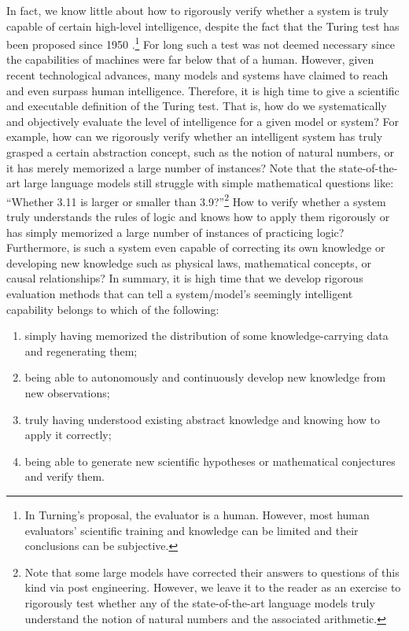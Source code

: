 \documentclass[../../book-main.tex]{subfiles}
\begin{document}
In fact, we know little about how to rigorously verify whether a system is truly capable of certain high-level intelligence, despite the fact that the Turing test has been proposed since 1950 \cite{Turing-1950}.\footnote{In Turning's proposal, the evaluator is a human. However, most human evaluators' scientific training and knowledge can be limited and their conclusions can be subjective.} For long such a test was not deemed necessary since the capabilities of machines were far below that of a human. However, given recent technological advances, many models and systems have claimed to reach and even surpass human intelligence. Therefore, it is high time to give a scientific and executable definition of the Turing test. That is, how do we systematically and objectively evaluate the level of intelligence for a given model or system? For example, how can we rigorously verify whether an intelligent system has truly grasped a certain abstraction concept, such as the notion of natural numbers, or it has merely memorized a large number of instances? Note that the state-of-the-art large language models still struggle with simple mathematical questions like: ``Whether 3.11 is larger or smaller than 3.9?''\footnote{Note that some large models have corrected their answers to questions of this kind via post engineering. However, we leave it to the reader as an exercise to rigorously test whether any of the state-of-the-art language models truly understand the notion of natural numbers and the associated arithmetic.} 
How to verify whether a system truly understands the rules of logic and knows how to apply them rigorously or has simply memorized a large number of instances of practicing logic? Furthermore, is such a system even capable of correcting its own knowledge or developing new knowledge such as physical laws, mathematical concepts, or causal relationships? In summary, it is high time that we develop rigorous evaluation methods that can tell a system/model's seemingly intelligent capability belongs to which of the following: 
\begin{enumerate}
    \item simply having memorized the distribution of some knowledge-carrying data and regenerating them;
    \item being able to autonomously and continuously develop new knowledge from new observations;
    \item truly having understood existing abstract knowledge and knowing how to apply it correctly;
    \item being able to generate new scientific hypotheses or mathematical conjectures and verify them.
\end{enumerate}
\end{document}
